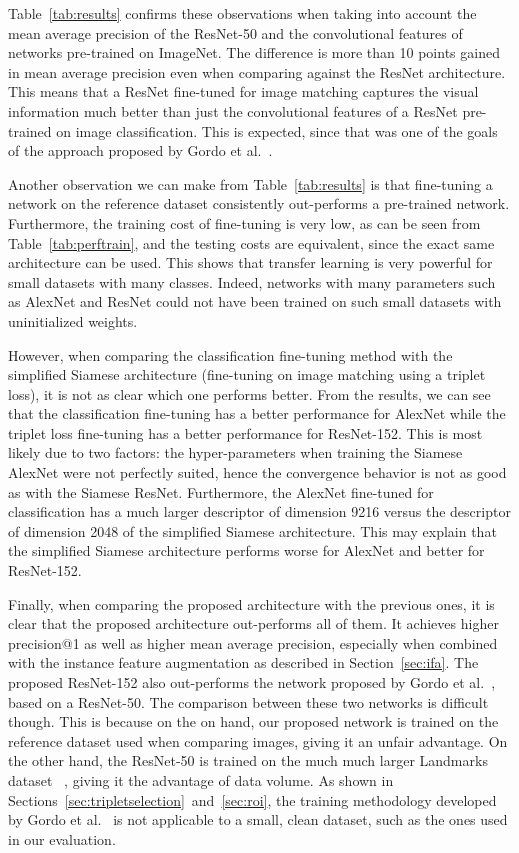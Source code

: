 Table~\ref{tab:results} confirms these observations when taking into
account the mean average precision of the ResNet-50
and the convolutional features of networks pre-trained on ImageNet.
The difference is more than 10 points gained in mean
average precision even when comparing against the ResNet architecture.
This means that a ResNet fine-tuned for image matching captures the
visual information much better than just the convolutional features
of a ResNet pre-trained on image classification.
This is expected, since that was one of the
goals of the approach proposed by Gordo et al.~\cite{gordo_deep_2016}.

Another observation we can make from Table~\ref{tab:results} is that
fine-tuning a network on the reference dataset consistently out-performs
a pre-trained network. Furthermore, the training cost of fine-tuning is
very low, as can be seen from Table~\ref{tab:perftrain}, and the testing
costs are equivalent, since the exact same architecture can be used.
This shows that transfer learning is very powerful for small datasets with
many classes. Indeed, networks with many parameters such as AlexNet and
ResNet could not have been trained on such small datasets with
uninitialized weights.

However, when comparing the classification fine-tuning method with the
simplified Siamese architecture (fine-tuning on image matching using a triplet loss),
it is not as clear which one performs better.
From the results, we can see that the classification fine-tuning has a better
performance for AlexNet while the triplet loss fine-tuning has a better
performance for ResNet-152. This is most likely due to two factors: the
hyper-parameters when training the Siamese AlexNet were not perfectly
suited, hence the convergence behavior is not as good as with the Siamese
ResNet. Furthermore, the AlexNet fine-tuned for classification has a much
larger descriptor of dimension 9216 versus the descriptor of dimension
2048 of the simplified Siamese architecture. This may explain that
the simplified Siamese architecture performs worse for AlexNet and
better for ResNet-152.

Finally, when comparing the proposed architecture with the previous ones,
it is clear that the proposed architecture out-performs all of them.
It achieves higher precision@1 as well as higher mean average precision,
especially when combined with the instance feature augmentation as described
in Section~\ref{sec:ifa}. The proposed ResNet-152 also out-performs the
network proposed by Gordo et al.~\cite{gordo_deep_2016}, based on a ResNet-50.
The comparison between these two networks is difficult though.
This is because on the on hand, our proposed
network is trained on the reference dataset used when comparing images,
giving it an unfair advantage. On the other hand, the ResNet-50
is trained on the much much larger Landmarks dataset
~\cite{babenko_neural_2014}, giving it the advantage of data volume.
As shown in Sections~\ref{sec:tripletselection}~and~\ref{sec:roi},
the training methodology developed by Gordo et al.~\cite{gordo_end--end_2017}
is not applicable to a small, clean dataset, such as the ones used in our
evaluation.


